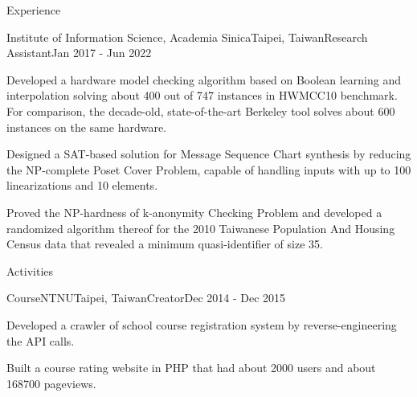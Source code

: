 \documentclass{resume} %
\begin{document}
\begin{rSection}{Experience}
\begin{rSubsection}{Institute of Information Science, Academia Sinica}{Taipei, Taiwan}{Research Assistant}{Jan 2017 - Jun 2022}
\item Developed a hardware model checking algorithm based on Boolean learning and interpolation solving about 400 out of 747 instances in HWMCC10 benchmark. For comparison, the decade-old, state-of-the-art Berkeley tool solves about 600 instances on the same hardware.
\item Designed a SAT-based solution for Message Sequence Chart synthesis by reducing the NP-complete Poset Cover Problem, capable of handling inputs with up to 100 linearizations and 10 elements.
\item Proved the NP-hardness of k-anonymity Checking Problem and developed a randomized algorithm thereof for the 2010 Taiwanese Population And Housing Census data that revealed a minimum quasi-identifier of size 35.
\end{rSubsection}

\end{rSection}

\begin{rSection}{Activities}

\begin{rSubsection}{CourseNTNU}{Taipei, Taiwan}{Creator}{Dec 2014 - Dec 2015}
\item Developed a crawler of school course registration system by reverse-engineering the API calls.
\item Built a course rating website in PHP that had about 2000 users and about 168700 pageviews.
\end{rSubsection}

\end{rSection}
\end{document}
